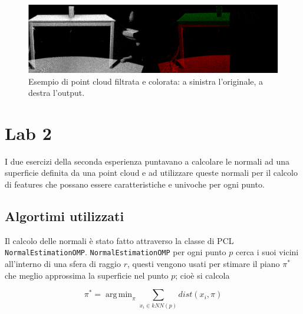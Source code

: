 \documentclass[a4paper]{article}
\DeclareMathOperator*{\argmin}{arg\,min}
\begin{document}
	\begin{figure}
		\centering
		\includegraphics[width=1\textwidth]{images/lab1.png}
		\caption{\label{fig:lab1}Esempio di point cloud filtrata e colorata: a sinistra l'originale, a destra l'output.}
	\end{figure}


\section{Lab 2} \label{sec:lab2}
I due esercizi della seconda esperienza puntavano a calcolare le normali ad una superficie definita da una point cloud e ad utilizzare queste normali per il calcolo di features che possano essere caratteristiche e univoche per ogni punto.

	\subsection{Algortimi utilizzati}
	Il calcolo delle normali è stato fatto attraverso la classe di PCL \verb|NormalEstimationOMP|. \verb|NormalEstimationOMP| per ogni punto $p$ cerca i suoi vicini all'interno di una sfera di raggio $r$, questi vengono usati per stimare il piano $\pi^*$ che meglio approssima la superficie nel punto $p$; cioè si calcola 
	
	\begin{equation}
	\pi^* = \argmin_{\pi}{\sum_{x_i \in kNN(p)}{dist(x_i,\pi)}}
	\end{equation}
	
\end{document}
